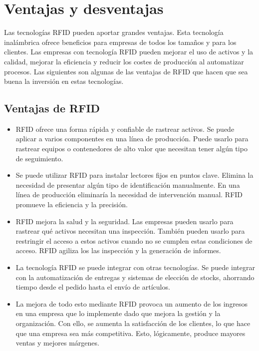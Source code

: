 \documentclass[12pt,a4paper,onecolumn,oneside]{report}
\begin{document}
\section{Ventajas y desventajas}
\label{Ventajas y desventajas}

Las tecnologías RFID pueden aportar grandes ventajas. Esta tecnología inalámbrica ofrece beneficios para empresas de todos los tamaños y para los clientes. Las empresas con tecnología RFID pueden mejorar el uso de activos y la calidad, mejorar la eficiencia y reducir los costes de producción al automatizar procesos. Las siguientes son algunas de las ventajas de RFID que hacen que sea buena la inversión en estas tecnologías.

\subsection{Ventajas de RFID}
\begin{itemize}
\item RFID ofrece una forma rápida y confiable de rastrear activos. Se puede aplicar a varios componentes en una línea de producción. Puede usarlo para rastrear equipos o contenedores de alto valor que necesitan tener algún tipo de seguimiento.
\item Se puede utilizar RFID para instalar lectores fijos en puntos clave. Elimina la necesidad de presentar algún tipo de identificación manualmente. En una línea de producción eliminaría la necesidad de intervención manual. RFID promueve la eficiencia y la precisión.
\item RFID mejora la salud y la seguridad. Las empresas pueden usarlo para rastrear qué activos necesitan una inspección. También pueden usarlo para restringir el acceso a estos activos cuando no se cumplen estas condiciones de acceso. RFID agiliza los las inspección y la generación de informes.
\item La tecnología RFID se puede integrar con otras tecnologías. Se puede integrar con la automatización de entregas y sistemas de elección de stocks, ahorrando tiempo desde el pedido hasta el envío de artículos.
\item La mejora de todo esto mediante RFID provoca un aumento de los ingresos en una empresa que lo implemente dado que mejora la gestión y la organización. Con ello, se aumenta la satisfacción de los clientes, lo que hace que una empresa sea más competitiva. Esto, lógicamente, produce mayores ventas y mejores márgenes.
\end{itemize}
\end{document}
